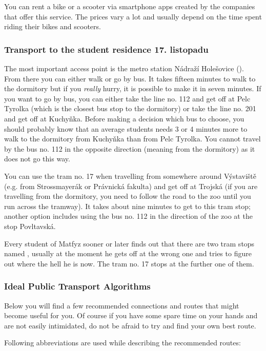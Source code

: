 You can rent a bike or a scooter via smartphone apps created by the companies
that offer this service. The prices vary a lot and usually depend on the time
spent riding their bikes and scooters.


\subsubsection{Transport to the student residence 17. listopadu}
The most important access point is the metro station Nádraží Holešovice (). From there you can either walk or go by bus.
It takes fifteen minutes to walk to the dormitory but if you \textit{really}
hurry, it is possible to make it in seven minutes.
If you want to go by bus, you can either take the line no. 112 and get off at
Pelc Tyrolka (which is the closest bus stop to the dormitory) or take the line
no. 201 and get off at Kuchyňka.
Before making a decision which bus to choose, you should probably know that an
average students needs 3 or 4 minutes more to walk to the dormitory from
Kuchyňka than from Pelc Tyrolka.
You cannot travel by the bus no. 112 in the opposite direction (meaning from the
dormitory) as it does not go this way.

You can use the tram no. 17 when travelling from somewhere around Výstaviště
(e.g. from Strossmayerák or Právnická fakulta) and get off at Trojská (if you
are travelling from the dormitory, you need to follow the road to the zoo until
you run across the tramway).
It takes about nine minutes to get to this tram stop; another option includes
using the bus no. 112 in the direction of the zoo at the stop Povltavská.

Every student of Matfyz sooner or later finds out that there are two tram stops
named , usually at the moment he gets off at the wrong
one and tries to figure out where the hell he is now.
The tram no. 17 stops at the further one of them.

\subsubsection{Ideal Public Transport Algorithms}
Below you will find a few recommended connections and routes that might become
useful for you. Of course if you have some spare time on your hands and are not
easily intimidated, do not be afraid to try and find your own best route.

Following abbreviations are used while describing the recommended routes:


